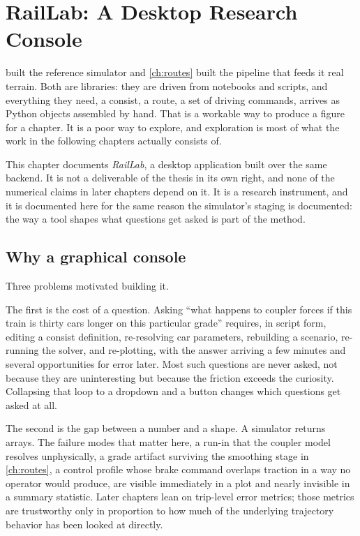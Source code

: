\chapter{RailLab: A Desktop Research Console}
\label{ch:raillab}

 built the reference simulator and \cref{ch:routes} built the pipeline that feeds it real terrain. Both are libraries: they are driven from notebooks and scripts, and everything they need, a consist, a route, a set of driving commands, arrives as Python objects assembled by hand. That is a workable way to produce a figure for a chapter. It is a poor way to explore, and exploration is most of what the work in the following chapters actually consists of.

This chapter documents \emph{RailLab}, a desktop application built over the same backend. It is not a deliverable of the thesis in its own right, and none of the numerical claims in later chapters depend on it. It is a research instrument, and it is documented here for the same reason the simulator's staging is documented: the way a tool shapes what questions get asked is part of the method.

\section{Why a graphical console}
\label{sec:raillab_motivation}

Three problems motivated building it.

The first is the cost of a question. Asking ``what happens to coupler forces if this train is thirty cars longer on this particular grade'' requires, in script form, editing a consist definition, re-resolving car parameters, rebuilding a scenario, re-running the solver, and re-plotting, with the answer arriving a few minutes and several opportunities for error later. Most such questions are never asked, not because they are uninteresting but because the friction exceeds the curiosity. Collapsing that loop to a dropdown and a button changes which questions get asked at all.

The second is the gap between a number and a shape. A simulator returns arrays. The failure modes that matter here, a run-in that the coupler model resolves unphysically, a grade artifact surviving the smoothing stage in \cref{ch:routes}, a control profile whose brake command overlaps traction in a way no operator would produce, are visible immediately in a plot and nearly invisible in a summary statistic. Later chapters lean on trip-level error metrics; those metrics are trustworthy only in proportion to how much of the underlying trajectory behavior has been looked at directly.

